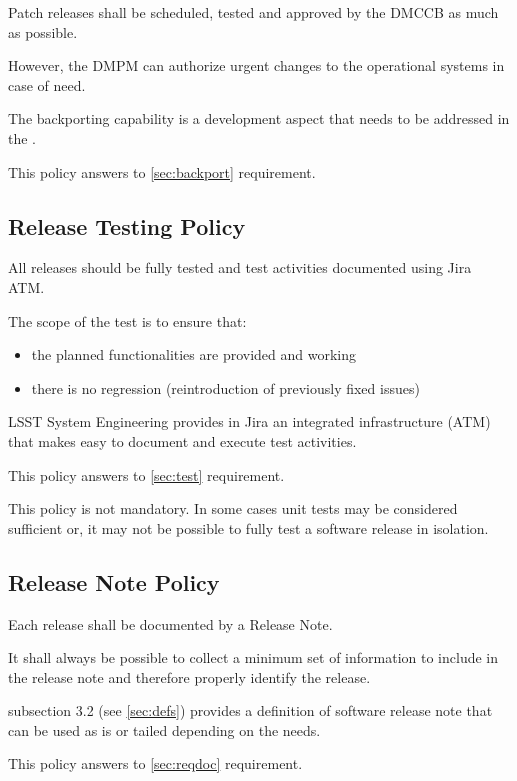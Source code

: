 Patch releases shall be scheduled, tested and approved by the DMCCB as much as possible.

However, the DMPM can authorize urgent changes to the operational systems in case of need.

The backporting capability is a development aspect that needs to be addressed in the .

This policy answers to \ref{sec:backport} requirement.


\subsection{Release Testing Policy} \label{sec:testpolicy}

All releases should be fully tested and test activities documented using Jira ATM.

The scope of the test is to ensure that:

\begin{itemize}
\item the planned functionalities are provided and working
\item there is no regression (reintroduction of previously fixed issues)
\end{itemize}

LSST System Engineering provides in Jira an integrated infrastructure (ATM) that makes easy to document and execute test activities.

This policy answers to \ref{sec:test} requirement.

This policy is not mandatory.
In some cases unit tests may be considered sufficient or, it may not be possible to fully test a software release in isolation.


\subsection{Release Note Policy} \label{sec:notepolicy}

Each release shall be documented by a Release Note.

It shall always be possible to collect a minimum set of information to include in the release note and therefore properly identify the release.

 subsection 3.2 (see \ref{sec:defs}) provides a definition of software release note that can be used as is or tailed depending on the needs.

This policy answers to \ref{sec:reqdoc} requirement.


